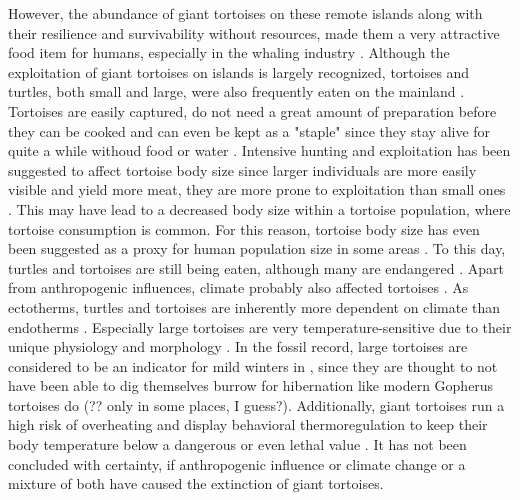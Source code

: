
However, the abundance of giant tortoises on these remote islands along with their resilience and survivability without resources, made them a very attractive food item for humans, especially in the whaling industry \citep{.}.
Although the exploitation of giant tortoises on islands is largely recognized, tortoises and turtles, both small and large, were also frequently eaten on the mainland \citep{.}.
Tortoises are easily captured, do not need a great amount of preparation before they can be cooked and can even be kept as a "staple" since they stay alive for quite a while withoud food or water \citep{Thompson2002,Thompson2014}. Intensive hunting and exploitation has been suggested to affect tortoise body size \citep{.} since larger individuals are more easily visible and yield more meat, they are more prone to exploitation than small ones \citep{Rhodin2015}. This may have lead to a decreased body size within a tortoise population, where tortoise consumption is common.
For this reason, tortoise body size has even been suggested as a proxy for human population size in some areas \citep{Steele2005,Stiner1999,Stiner2000}.
To this day, turtles and tortoises are still being eaten, although many are endangered \citep{.}.
Apart from anthropogenic influences, climate probably also affected tortoises \citep{.}. 
As ectotherms, turtles and tortoises are inherently more dependent on climate than endotherms \citep{.}. Especially large tortoises are very temperature-sensitive due to their unique physiology and morphology \citep{Swingland1979a, Swingland1979b}. In the fossil record, large tortoises are considered to be an indicator for mild winters in \citep{Hibbard1960,Schleich1981}, since they are thought to not have been able to dig themselves burrow for hibernation like modern Gopherus tortoises do (?? only in some places, I guess?)\citep{Carlson1999, Stojanov2009}. Additionally, giant tortoises run a high risk of overheating and display behavioral thermoregulation to keep their body temperature below a dangerous or even lethal value \citep{Sturbaum1982, Schleich1981}.
It has not been concluded with certainty, if anthropogenic influence or climate change or a mixture of both have caused the extinction of giant tortoises\citep{.}.

